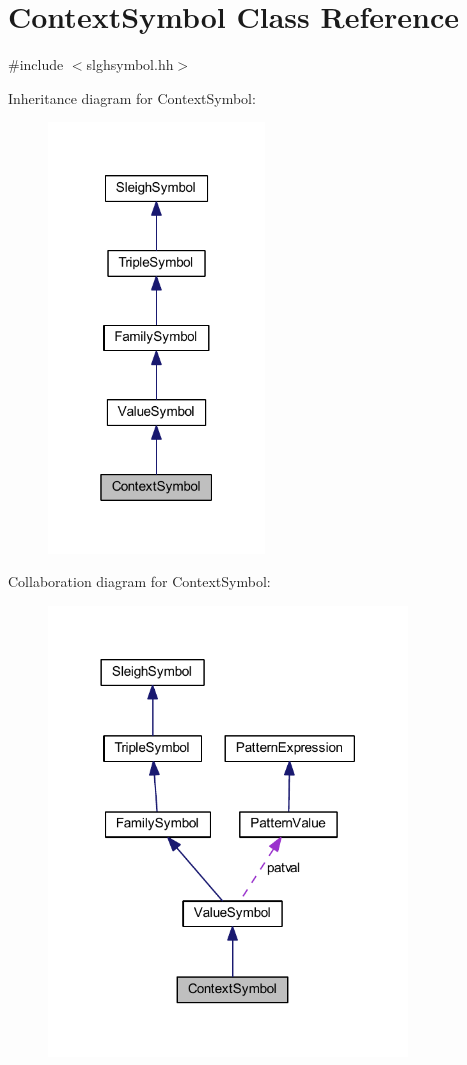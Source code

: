 \hypertarget{class_context_symbol}{}\section{Context\+Symbol Class Reference}
\label{class_context_symbol}


{\ttfamily \#include $<$slghsymbol.\+hh$>$}



Inheritance diagram for Context\+Symbol\+:
\nopagebreak
\begin{figure}[H]
\begin{center}
\leavevmode
\includegraphics[width=163pt]{class_context_symbol__inherit__graph}
\end{center}
\end{figure}


Collaboration diagram for Context\+Symbol\+:
\nopagebreak
\begin{figure}[H]
\begin{center}
\leavevmode
\includegraphics[width=270pt]{class_context_symbol__coll__graph}
\end{center}
\end{figure}
